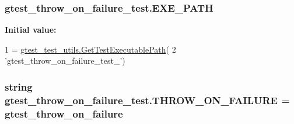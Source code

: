 \subsubsection[{\texorpdfstring{E\+X\+E\+\_\+\+P\+A\+TH}{EXE_PATH}}]{\setlength{\rightskip}{0pt plus 5cm}gtest\+\_\+throw\+\_\+on\+\_\+failure\+\_\+test.\+E\+X\+E\+\_\+\+P\+A\+TH}\hypertarget{namespacegtest__throw__on__failure__test_ac38dda23e362ecc76943073d173294f1}{}\label{namespacegtest__throw__on__failure__test_ac38dda23e362ecc76943073d173294f1}
{\bfseries Initial value\+:}
\begin{DoxyCode}
1 = \hyperlink{namespacegtest__test__utils_a89ed3717984a80ffbb7a9c92f71b86a2}{gtest\_test\_utils.GetTestExecutablePath}(
2     \textcolor{stringliteral}{'gtest\_throw\_on\_failure\_test\_'})
\end{DoxyCode}
\subsubsection[{\texorpdfstring{T\+H\+R\+O\+W\+\_\+\+O\+N\+\_\+\+F\+A\+I\+L\+U\+RE}{THROW_ON_FAILURE}}]{\setlength{\rightskip}{0pt plus 5cm}string gtest\+\_\+throw\+\_\+on\+\_\+failure\+\_\+test.\+T\+H\+R\+O\+W\+\_\+\+O\+N\+\_\+\+F\+A\+I\+L\+U\+RE = \textquotesingle{}gtest\+\_\+throw\+\_\+on\+\_\+failure\textquotesingle{}}\hypertarget{namespacegtest__throw__on__failure__test_af837d05b7ed8498aed8202c1d83d1e7a}{}\label{namespacegtest__throw__on__failure__test_af837d05b7ed8498aed8202c1d83d1e7a}
